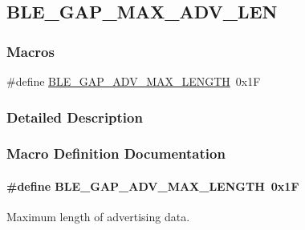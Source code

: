 \hypertarget{group___b_l_e___g_a_p___m_a_x___a_d_v___l_e_n}{}\subsection{B\+L\+E\+\_\+\+G\+A\+P\+\_\+\+M\+A\+X\+\_\+\+A\+D\+V\+\_\+\+L\+EN}
\label{group___b_l_e___g_a_p___m_a_x___a_d_v___l_e_n}
\subsubsection*{Macros}
\begin{DoxyCompactItemize}
\item 
\#define \hyperlink{group___b_l_e___g_a_p___m_a_x___a_d_v___l_e_n_gaef184d7f23b1fa255e4ebfff7be16421}{B\+L\+E\+\_\+\+G\+A\+P\+\_\+\+A\+D\+V\+\_\+\+M\+A\+X\+\_\+\+L\+E\+N\+G\+TH}~0x1F
\end{DoxyCompactItemize}


\subsubsection{Detailed Description}


\subsubsection{Macro Definition Documentation}
\paragraph[{\texorpdfstring{B\+L\+E\+\_\+\+G\+A\+P\+\_\+\+A\+D\+V\+\_\+\+M\+A\+X\+\_\+\+L\+E\+N\+G\+TH}{BLE_GAP_ADV_MAX_LENGTH}}]{\setlength{\rightskip}{0pt plus 5cm}\#define B\+L\+E\+\_\+\+G\+A\+P\+\_\+\+A\+D\+V\+\_\+\+M\+A\+X\+\_\+\+L\+E\+N\+G\+TH~0x1F}\hypertarget{group___b_l_e___g_a_p___m_a_x___a_d_v___l_e_n_gaef184d7f23b1fa255e4ebfff7be16421}{}\label{group___b_l_e___g_a_p___m_a_x___a_d_v___l_e_n_gaef184d7f23b1fa255e4ebfff7be16421}
Maximum length of advertising data. 